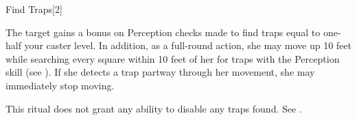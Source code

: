\begin{spellsection}{Find Traps}[2]
    \begin{spellheader}
    \end{spellheader}
    \begin{spellcontent}
        \begin{spelltargetinginfo}
        \end{spelltargetinginfo}
        \begin{spelleffects}

            \spelleffect The target gains a bonus on Perception checks made to find traps equal to one-half your caster level. In addition, as a full-round action, she may move up 10 feet while searching every square within 10 feet of her for traps with the Perception skill (see ). If she detects a trap partway through her movement, she may immediately stop moving.
            \spelldur \durmed
        \end{spelleffects}
    \end{spellcontent}
    \begin{spellfooter}
        \spellnotes This ritual does not grant any ability to disable any traps found. See .
    \end{spellfooter}
\end{spellsection}

